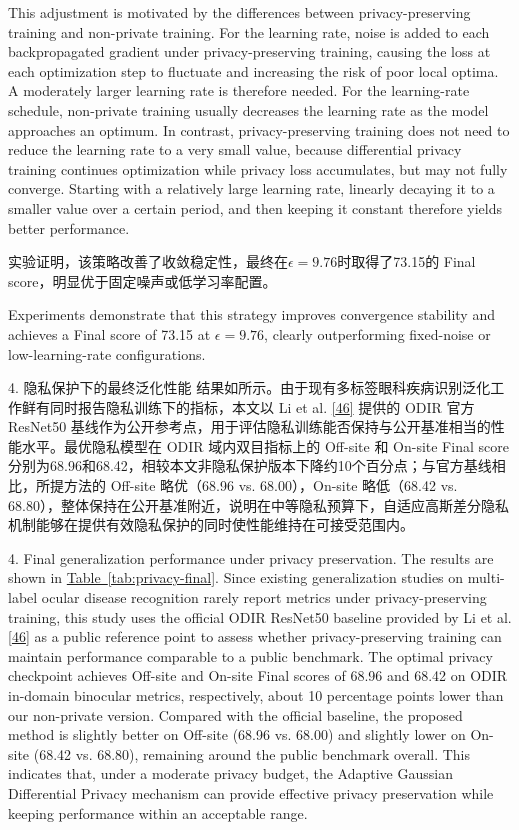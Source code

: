 This adjustment is motivated by the differences between privacy-preserving training and non-private training. For the learning rate, noise is added to each backpropagated gradient under privacy-preserving training, causing the loss at each optimization step to fluctuate and increasing the risk of poor local optima. A moderately larger learning rate is therefore needed. For the learning-rate schedule, non-private training usually decreases the learning rate as the model approaches an optimum. In contrast, privacy-preserving training does not need to reduce the learning rate to a very small value, because differential privacy training continues optimization while privacy loss accumulates, but may not fully converge. Starting with a relatively large learning rate, linearly decaying it to a smaller value over a certain period, and then keeping it constant therefore yields better performance.

实验证明，该策略改善了收敛稳定性，最终在\(\epsilon = 9.76\)时取得了73.15的 Final score，明显优于固定噪声或低学习率配置。

Experiments demonstrate that this strategy improves convergence stability and achieves a Final score of 73.15 at \(\epsilon = 9.76\), clearly outperforming fixed-noise or low-learning-rate configurations.

4. 隐私保护下的最终泛化性能 结果如所示。由于现有多标签眼科疾病识别泛化工作鲜有同时报告隐私训练下的指标，本文以 Li et al. \hyperref[_Ref213949402]{{[}46{]}} 提供的 ODIR 官方 ResNet50 基线作为公开参考点，用于评估隐私训练能否保持与公开基准相当的性能水平。最优隐私模型在 ODIR 域内双目指标上的 Off-site 和 On-site Final score 分别为68.96和68.42，相较本文非隐私保护版本下降约10个百分点；与官方基线相比，所提方法的 Off-site 略优（68.96 vs. 68.00），On-site 略低（68.42 vs. 68.80），整体保持在公开基准附近，说明在中等隐私预算下，自适应高斯差分隐私机制能够在提供有效隐私保护的同时使性能维持在可接受范围内。

4. Final generalization performance under privacy preservation. The results are shown in \hyperref[tab:privacy-final]{Table~\ref*{tab:privacy-final}}. Since existing generalization studies on multi-label ocular disease recognition rarely report metrics under privacy-preserving training, this study uses the official ODIR ResNet50 baseline provided by Li et al. \hyperref[_Ref213949402]{{[}46{]}} as a public reference point to assess whether privacy-preserving training can maintain performance comparable to a public benchmark. The optimal privacy checkpoint achieves Off-site and On-site Final scores of 68.96 and 68.42 on ODIR in-domain binocular metrics, respectively, about 10 percentage points lower than our non-private version. Compared with the official baseline, the proposed method is slightly better on Off-site (68.96 vs. 68.00) and slightly lower on On-site (68.42 vs. 68.80), remaining around the public benchmark overall. This indicates that, under a moderate privacy budget, the Adaptive Gaussian Differential Privacy mechanism can provide effective privacy preservation while keeping performance within an acceptable range.

